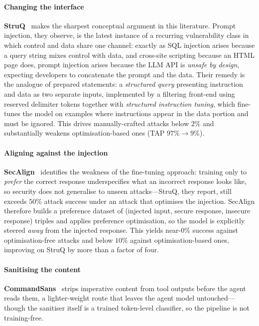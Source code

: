 \documentclass[preprint,12pt,authoryear]{elsarticle}
\theoremstyle{definition}
\begin{document}
\paragraph{Changing the interface}
\textbf{StruQ}~\citep{chen2025struq} makes the sharpest conceptual argument in
this literature. Prompt injection, they observe, is the latest instance of a
recurring vulnerability class in which control and data share one channel:
exactly as SQL injection arises because a query string mixes control with data,
and cross-site scripting because an HTML page does, prompt injection arises
because the LLM API is \emph{unsafe by design}, expecting developers to
concatenate the prompt and the data. Their remedy is the analogue of prepared
statements: a \emph{structured query} presenting instruction and data as two
separate inputs, implemented by a filtering front-end using reserved delimiter
tokens together with \emph{structured instruction tuning}, which fine-tunes the
model on examples where instructions appear in the data portion and must be
ignored. This drives manually-crafted attacks below $2\%$ and substantially
weakens optimisation-based ones (TAP $97\% \to 9\%$).

\paragraph{Aligning against the injection}
\textbf{SecAlign}~\citep{chen2025secalign} identifies the weakness of the
fine-tuning approach: training only to \emph{prefer} the correct response
underspecifies what an incorrect response looks like, so security does not
generalise to unseen attacks---StruQ, they report, still exceeds $50\%$ attack
success under an attack that optimises the injection. SecAlign therefore builds a
preference dataset of (injected input, secure response, insecure response) triples
and applies preference optimisation, so the model is explicitly steered
\emph{away} from the injected response. This yields near-$0\%$ success against
optimisation-free attacks and below $10\%$ against optimisation-based ones,
improving on StruQ by more than a factor of four.

\paragraph{Sanitising the content}
\textbf{CommandSans}~\citep{das2025commandsans} strips imperative content from
tool outputs before the agent reads them, a lighter-weight route that leaves the
agent model untouched---though the sanitiser itself is a trained token-level
classifier, so the pipeline is not training-free.
\end{document}
